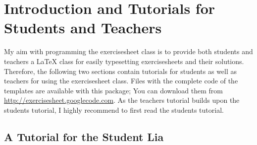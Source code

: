 \documentclass[a4paper,fleqn,9pt]{report}
\let\sffamily=\rmfamily
\def\exercisesheet{{exercisesheet}}
\begin{document}

\begin{abstract}
  The \exercisesheet{} class provides a convenient way to produce
  hiqh-quality exercise sheets for both students and teachers. This
  is the official manual. It contains tutorials for students and
  teachers that explain the first steps in using this class.
  Moreover, a complete list of the commands defined by the
  \exercisesheet{} class is contained.
\end{abstract}

\tableofcontents

\chapter{Introduction and Tutorials for Students and Teachers}

My aim with programming the \exercisesheet{} class is to provide both
students and teachers a \LaTeX{} class for easily typesetting
exercisesheets and their solutions. Therefore, the following two
sections contain tutorials for students as well as teachers for using
the \exercisesheet{} class. Files with the complete code of the
templates are available with this package; You can download them from
\url{http://exercisesheet.googlecode.com}. As the teachers tutorial
builds upon the students tutorial, I highly recommend to first read
the students tutorial.

\section{A Tutorial for the Student Lia}
\end{document}
